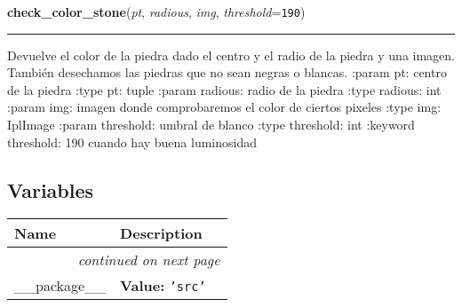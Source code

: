     \vspace{0.5ex}

\hspace{.8\funcindent}\begin{boxedminipage}{\funcwidth}

    \raggedright \textbf{check\_color\_stone}(\textit{pt}, \textit{radious}, \textit{img}, \textit{threshold}={\tt 190})

    \vspace{-1.5ex}

    \rule{\textwidth}{0.5\fboxrule}
\setlength{\parskip}{2ex}

Devuelve el color de la piedra dado el centro y el radio de la piedra y
una imagen. También desechamos las piedras que no sean negras o blancas.
:param pt: centro de la piedra
:type pt: tuple
:param radious: radio de la piedra
:type radious: int
:param img: imagen donde comprobaremos el color de ciertos pixeles
:type img: IplImage
:param threshold: umbral de blanco
:type threshold: int
:keyword threshold: 190 cuando hay buena luminosidad
\setlength{\parskip}{1ex}
    \end{boxedminipage}



  \subsection{Variables}

    \vspace{-1cm}
\hspace{\varindent}\begin{longtable}{|p{\varnamewidth}|p{\vardescrwidth}|l}
\cline{1-2}
\cline{1-2} \centering \textbf{Name} & \centering \textbf{Description}& \\
\cline{1-2}
\endhead\cline{1-2}\multicolumn{3}{r}{\small\textit{continued on next page}}\\\endfoot\cline{1-2}
\endlastfoot\raggedright \_\-\_\-p\-a\-c\-k\-a\-g\-e\-\_\-\_\- & \raggedright \textbf{Value:} 
{\tt \texttt{'}\texttt{src}\texttt{'}}&\\
\cline{1-2}
\end{longtable}

